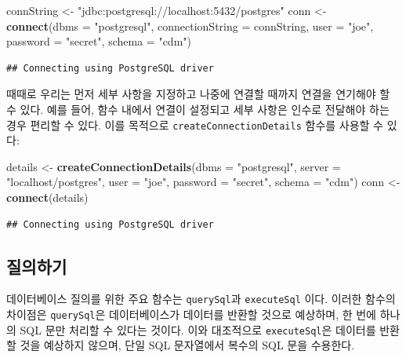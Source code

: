 \documentclass[11pt]{book}
\newenvironment{Shaded}{\begin{snugshade}}{\end{snugshade}}
\newcommand{\KeywordTok}[1]{\textcolor[rgb]{0.13,0.29,0.53}{\textbf{#1}}}
\newcommand{\DataTypeTok}[1]{\textcolor[rgb]{0.13,0.29,0.53}{#1}}
\newcommand{\StringTok}[1]{\textcolor[rgb]{0.31,0.60,0.02}{#1}}
\newcommand{\NormalTok}[1]{#1}
\theoremstyle{definition}
\theoremstyle{definition}
\theoremstyle{definition}
\theoremstyle{remark}
\begin{document}
\begin{Shaded}
\begin{Highlighting}[]
\NormalTok{connString <-}\StringTok{ "jdbc:postgresql://localhost:5432/postgres"}
\NormalTok{conn <-}\StringTok{ }\KeywordTok{connect}\NormalTok{(}\DataTypeTok{dbms =} \StringTok{"postgresql"}\NormalTok{,}
                \DataTypeTok{connectionString =}\NormalTok{ connString,}
                \DataTypeTok{user =} \StringTok{"joe"}\NormalTok{,}
                \DataTypeTok{password =} \StringTok{"secret"}\NormalTok{,}
                \DataTypeTok{schema =} \StringTok{"cdm"}\NormalTok{)}
\end{Highlighting}
\end{Shaded}

\begin{verbatim}
## Connecting using PostgreSQL driver
\end{verbatim}

때때로 우리는 먼저 세부 사항을 지정하고 나중에 연결할 때까지 연결을
연기해야 할 수 있다. 예를 들어, 함수 내에서 연결이 설정되고 세부 사항은
인수로 전달해야 하는 경우 편리할 수 있다. 이를 목적으로
\texttt{createConnectionDetails} 함수를 사용할 수 있다:

\begin{Shaded}
\begin{Highlighting}[]
\NormalTok{details <-}\StringTok{ }\KeywordTok{createConnectionDetails}\NormalTok{(}\DataTypeTok{dbms =} \StringTok{"postgresql"}\NormalTok{,}
                                   \DataTypeTok{server =} \StringTok{"localhost/postgres"}\NormalTok{,}
                                   \DataTypeTok{user =} \StringTok{"joe"}\NormalTok{,}
                                   \DataTypeTok{password =} \StringTok{"secret"}\NormalTok{,}
                                   \DataTypeTok{schema =} \StringTok{"cdm"}\NormalTok{)}
\NormalTok{conn <-}\StringTok{ }\KeywordTok{connect}\NormalTok{(details)}
\end{Highlighting}
\end{Shaded}

\begin{verbatim}
## Connecting using PostgreSQL driver
\end{verbatim}

\subsection{질의하기}

데이터베이스 질의를 위한 주요 함수는 \texttt{querySql}과
\texttt{executeSql} 이다. 이러한 함수의 차이점은 \texttt{querySql}은
데이터베이스가 데이터를 반환할 것으로 예상하며, 한 번에 하나의 SQL 문만
처리할 수 있다는 것이다. 이와 대조적으로 \texttt{executeSql}은 데이터를
반환할 것을 예상하지 않으며, 단일 SQL 문자열에서 복수의 SQL 문을
수용한다. 
\end{document}
